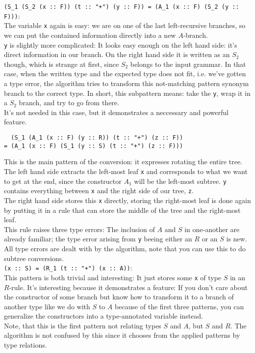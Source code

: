 \documentclass[a4paper]{article}
\begin{document}
\verb|(S_1 (S_2 (x :: F)) (t :: "+") (y :: F)) = (A_1 (x :: F) (S_2 (y :: F)))|:\\
The variable \verb|x| again is easy: we are on one of the last left-recursive branches, so we can put the contained information directly into a new $A$-branch.\\
\verb|y| is slightly more complicated: It looks easy enough on the left hand side: it's direct information in our branch. On the right hand side it is written as an $S_2$ though, which is strange at first, since $S_2$ belongs to the input grammar.
In that case, when the written type and the expected type does not fit, i.e. we've gotten a type error, the algorithm tries to transform this not-matching pattern synonym branch to the correct type. In short, this subpattern means: take the \verb|y|, wrap it in a $S_2$ branch, and try to go from there.\\
It's not needed in this case, but it demonstrates a neccessary and powerful feature. %
%
\begin{verbatim}
  (S_1 (A_1 (x :: F) (y :: R)) (t :: "+") (z :: F)) 
= (A_1 (x :: F) (S_1 (y :: S) (t :: "+") (z :: F)))
\end{verbatim}
This is the main pattern of the conversion: it expresses rotating the entire tree.\\
The left hand side extracts the left-most leaf \verb|x| and corresponds to what we want to get at the end, since the constructor $A_1$ will be the left-most subtree. \verb|y| contains everything between \verb|x| and the right side of our tree, \verb|z|.\\
The right hand side stores this \verb|x| directly, storing the right-most leaf is done again by putting it in a rule that can store the middle of the tree and the right-most leaf.\\
This rule raises three type errors: The inclusion of $A$ and $S$ in one-another are already familiar; the type error arising from \verb|y| beeing either an $R$ or an $S$ is new. All type errors are dealt with by the algorithm, note that you can use this to do subtree conversions.\\

\verb|(x :: S) = (R_1 (t :: "+") (x :: A))|:\\
This pattern is both trivial and interesting: It just stores some \verb|x| of type $S$ in an $R$-rule. It's interesting because it demonstrates a feature: If you don't care about the constructor of some branch but know how to transform it to a branch of another type like we do with $S$ to $A$ because of the first three patterns, you can generalize the constructors into a type-annotated variable instead.\\
Note, that this is the first pattern not relating types $S$ and $A$, but $S$ and $R$. The algorithm is not confused by this since it chooses from the applied patterns by type relations.\\
\end{document}
